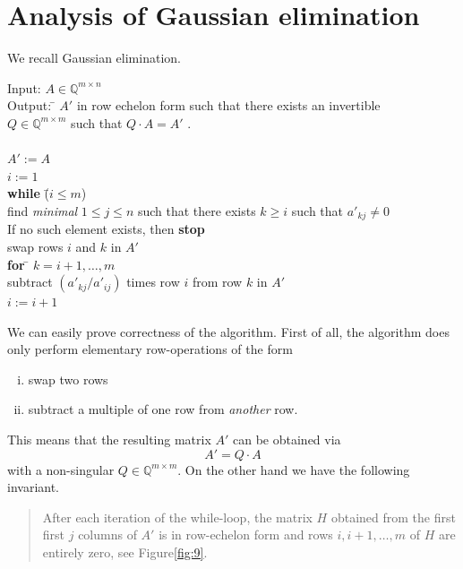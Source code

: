 \section{Analysis of Gaussian elimination} 
\label{sec:analys-gauss-elim}

We recall Gaussian elimination. 

\begin{algorithm}
  \label{alg:3}
  \begin{tabbing}
    Input: $A ∈ ℚ^{m ×n}$  \\
    Output: \= $A'$ in row echelon form such that there exists an invertible \\ 
            \> $Q ∈ ℚ^{m × m}$ such that $Q⋅A = A'$ . \\
            \pushtabs 
\\
$A' := A$ \\
$i := 1$\\
{\bf while} \=  ($i≤m$)  \\
\> find \emph{minimal} $1 ≤ j ≤n$ such that there exists $k≥i$ such that $a'_{kj} ≠ 0$ \\
\> If no such element exists, then {\bf stop} \\
            \> swap rows $i$ and $k$ in $A'$ \\
            \>  {\bf for} \= $k = i+1,\dots, m$ \\
            \>            \> subtract $(a'_{kj}/a'_{ij})$ times row $i$ from row $k$ in $A'$  \\
\> $i:=i+1$ 
\poptabs        
  \end{tabbing}
\end{algorithm}

\noindent 
We can easily prove correctness of the algorithm. First of all, the algorithm does only perform elementary row-operations of the form 
\begin{enumerate}[i)]
\item swap two rows 
\item subtract a multiple of one row from \emph{another} row. 
\end{enumerate}
This means that the resulting matrix $A'$ can be obtained via 
\begin{displaymath}
  A' = Q ⋅ A
\end{displaymath}
with a non-singular $Q ∈ ℚ^{m × m}$. On the other hand we have the following invariant. 
\begin{quote}
  After each iteration of the while-loop, the matrix $H$ obtained from the first  first $j$ columns of $A'$ is  in row-echelon form and rows $i,i+1,\dots,m$ of $H$  are entirely zero, see Figure\ref{fig:9}.  
\end{quote}

